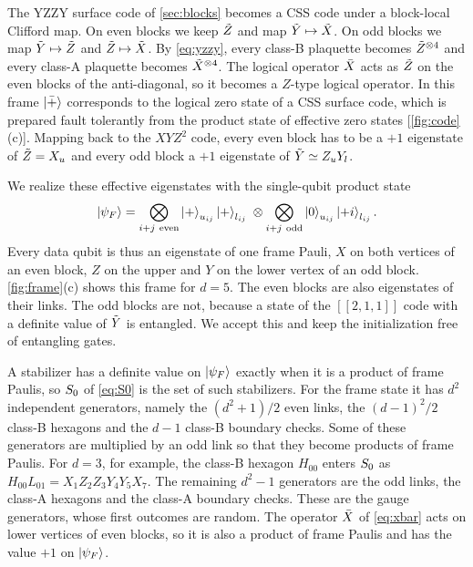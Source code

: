 The YZZY surface code of \autoref{sec:blocks} becomes a CSS code under a block-local Clifford map. On even blocks we keep $\tilde{Z}$ and map $\tilde{Y}\mapsto\tilde{X}$. On odd blocks we map $\tilde{Y}\mapsto\tilde{Z}$ and $\tilde{Z}\mapsto\tilde{X}$. By \autoref{eq:yzzy}, every class-B plaquette becomes $\tilde{Z}^{\otimes4}$ and every class-A plaquette becomes $\tilde{X}^{\otimes4}$. The logical operator $\bar{X}$ acts as $\tilde{Z}$ on the even blocks of the anti-diagonal, so it becomes a $Z$-type logical operator. In this frame $\left|\bar{+}\right\rangle$ corresponds to the logical zero state of a CSS surface code, which is prepared fault tolerantly from the product state of effective zero states [\autoref{fig:code}(c)]. Mapping back to the $XYZ^2$ code, every even block has to be a $+1$ eigenstate of $\tilde{Z}=X_u$ and every odd block a $+1$ eigenstate of $\tilde{Y}\simeq Z_uY_l$.

We realize these effective eigenstates with the single-qubit product state
\begin{equation}
  \ket{\psi_F}=\bigotimes_{i+j\ \mathrm{even}}\ket{+}_{u_{ij}}\ket{+}_{l_{ij}}\;\otimes\bigotimes_{i+j\ \mathrm{odd}}\ket{0}_{u_{ij}}\ket{{+}i}_{l_{ij}}.
  \label{eq:frame}
\end{equation}
Every data qubit is thus an eigenstate of one frame Pauli, $X$ on both vertices of an even block, $Z$ on the upper and $Y$ on the lower vertex of an odd block. \autoref{fig:frame}(c) shows this frame for $d=5$. The even blocks are also eigenstates of their links. The odd blocks are not, because a state of the $[[2,1,1]]$ code with a definite value of $\tilde{Y}$ is entangled. We accept this and keep the initialization free of entangling gates.

A stabilizer has a definite value on $\left|\psi_F\right\rangle$ exactly when it is a product of frame Paulis, so $S_0$ of \autoref{eq:S0} is the set of such stabilizers. For the frame state it has $d^2$ independent generators, namely the $(d^2+1)/2$ even links, the $(d-1)^2/2$ class-B hexagons and the $d-1$ class-B boundary checks. Some of these generators are multiplied by an odd link so that they become products of frame Paulis. For $d=3$, for example, the class-B hexagon $H_{00}$ enters $S_0$ as $H_{00}L_{01}=X_1Z_2Z_3Y_4Y_5X_7$. The remaining $d^2-1$ generators are the odd links, the class-A hexagons and the class-A boundary checks. These are the gauge generators, whose first outcomes are random. The operator $\bar{X}$ of \autoref{eq:xbar} acts on lower vertices of even blocks, so it is also a product of frame Paulis and has the value $+1$ on $\left|\psi_F\right\rangle$.

